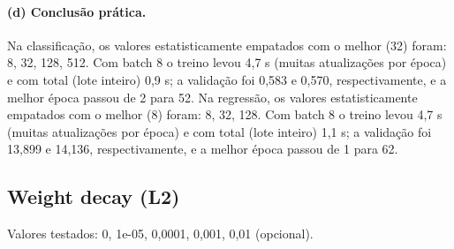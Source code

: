 \documentclass[11pt,a4paper]{article}
\begin{document}
\paragraph{(d) Conclusão prática.} Na classificação, os valores estatisticamente empatados com o melhor (32) foram: 8, 32, 128, 512. Com batch 8 o treino levou 4,7 s (muitas atualizações por época) e com total (lote inteiro) 0,9 s; a validação foi 0,583 e 0,570, respectivamente, e a melhor época passou de 2 para 52. Na regressão, os valores estatisticamente empatados com o melhor (8) foram: 8, 32, 128. Com batch 8 o treino levou 4,7 s (muitas atualizações por época) e com total (lote inteiro) 1,1 s; a validação foi 13,899 e 14,136, respectivamente, e a melhor época passou de 1 para 62.

\subsection{Weight decay (L2)}
Valores testados: 0, 1e-05, 0,0001, 0,001, 0,01 (opcional).
\end{document}
